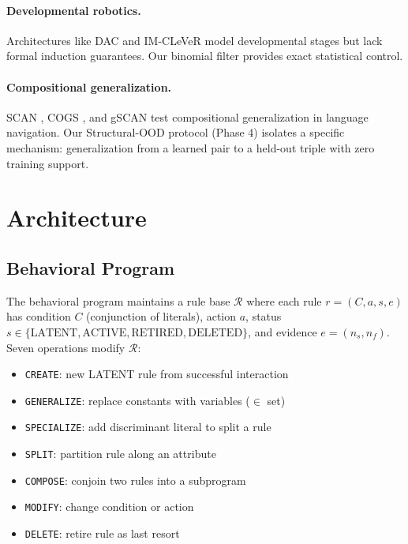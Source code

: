 \documentclass[11pt]{article}
\newcommand{\calR}{\mathcal{R}}
\begin{document}
\paragraph{Developmental robotics.} Architectures like DAC \cite{verschure2016distributed} and IM-CLeVeR \cite{baldassarre2014intrinsically} model developmental stages but lack formal induction guarantees. Our binomial filter provides exact statistical control.

\paragraph{Compositional generalization.} SCAN \cite{lake2018generalization}, COGS \cite{kim2020cogs}, and gSCAN \cite{ruis2020benchmark} test compositional generalization in language navigation. Our Structural-OOD protocol (Phase 4) isolates a specific mechanism: generalization from a learned pair to a held-out triple with zero training support.

\section{Architecture}
\label{sec:arch}

\subsection{Behavioral Program}
The behavioral program maintains a rule base $\calR$ where each rule $r = (C, a, s, e)$ has condition $C$ (conjunction of literals), action $a$, status $s \in \{\text{LATENT}, \text{ACTIVE}, \text{RETIRED}, \text{DELETED}\}$, and evidence $e = (n_s, n_f)$. Seven operations modify $\calR$:
\begin{itemize}
    \item \texttt{CREATE}: new LATENT rule from successful interaction
    \item \texttt{GENERALIZE}: replace constants with variables ($\in$ set)
    \item \texttt{SPECIALIZE}: add discriminant literal to split a rule
    \item \texttt{SPLIT}: partition rule along an attribute
    \item \texttt{COMPOSE}: conjoin two rules into a subprogram
    \item \texttt{MODIFY}: change condition or action
    \item \texttt{DELETE}: retire rule as last resort
\end{itemize}
\end{document}
